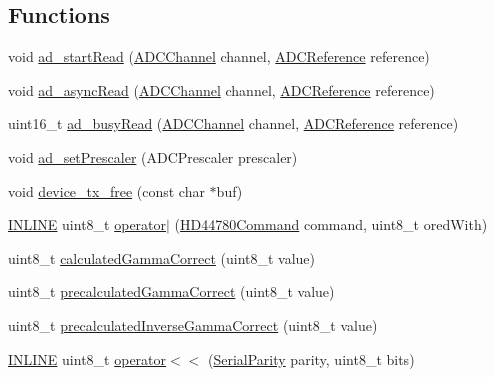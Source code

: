 \subsection*{Functions}
\begin{DoxyCompactItemize}
\item 
void \hyperlink{namespaceflame_af1bf47861c75f21732e61a9a192afc5a}{ad\-\_\-start\-Read} (\hyperlink{atmega1280_8h_ab5a361d214bf33f4d9d443d9db44043d}{A\-D\-C\-Channel} channel, \hyperlink{atmega1280_8h_ad19819a3e7273f98d571eab79f5a5d81}{A\-D\-C\-Reference} reference)
\item 
void \hyperlink{namespaceflame_a7934f05c664858812b35a056abfdd29f}{ad\-\_\-async\-Read} (\hyperlink{atmega1280_8h_ab5a361d214bf33f4d9d443d9db44043d}{A\-D\-C\-Channel} channel, \hyperlink{atmega1280_8h_ad19819a3e7273f98d571eab79f5a5d81}{A\-D\-C\-Reference} reference)
\item 
uint16\-\_\-t \hyperlink{namespaceflame_a889fda2bed3a1708f2df30b4fe50386c}{ad\-\_\-busy\-Read} (\hyperlink{atmega1280_8h_ab5a361d214bf33f4d9d443d9db44043d}{A\-D\-C\-Channel} channel, \hyperlink{atmega1280_8h_ad19819a3e7273f98d571eab79f5a5d81}{A\-D\-C\-Reference} reference)
\item 
void \hyperlink{namespaceflame_a4a26cfc385d3516e0c138836b873c950}{ad\-\_\-set\-Prescaler} (A\-D\-C\-Prescaler prescaler)
\item 
void \hyperlink{namespaceflame_ae1608504b2eb6d5f725f57f97feb93fb}{device\-\_\-tx\-\_\-free} (const char $\ast$buf)
\item 
\hyperlink{io_8h_a2eb6f9e0395b47b8d5e3eeae4fe0c116}{I\-N\-L\-I\-N\-E} uint8\-\_\-t \hyperlink{namespaceflame_af4c71a97c25a2b209ba41dcbc9164237}{operator$\vert$} (\hyperlink{namespaceflame_ad814bac19b0569ff480de071076a23e9}{H\-D44780\-Command} command, uint8\-\_\-t ored\-With)
\item 
uint8\-\_\-t \hyperlink{namespaceflame_af25b8343a10ba8a78d51592d8f9f0342}{calculated\-Gamma\-Correct} (uint8\-\_\-t value)
\item 
uint8\-\_\-t \hyperlink{namespaceflame_a90794bdaf6b69bd6e6f5d8b309986384}{precalculated\-Gamma\-Correct} (uint8\-\_\-t value)
\item 
uint8\-\_\-t \hyperlink{namespaceflame_adb7a1e373f09ca7865a85fe3483d2e71}{precalculated\-Inverse\-Gamma\-Correct} (uint8\-\_\-t value)
\item 
\hyperlink{io_8h_a2eb6f9e0395b47b8d5e3eeae4fe0c116}{I\-N\-L\-I\-N\-E} uint8\-\_\-t \hyperlink{namespaceflame_ad05b8adcc4f6c78d84754f078e1f91a0}{operator$<$$<$} (\hyperlink{namespaceflame_a6613d9a37cacb0a55b287dcf2f60f5db}{Serial\-Parity} parity, uint8\-\_\-t bits)

\end{DoxyCompactItemize}
